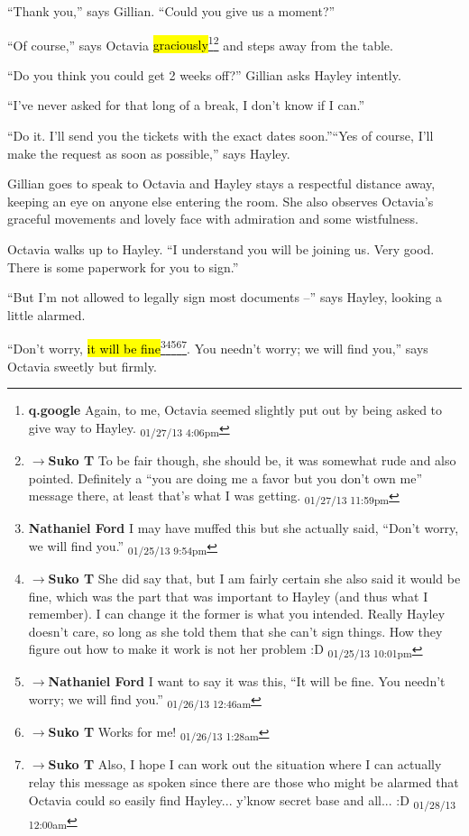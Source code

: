 ``Thank you,'' says Gillian.  ``Could you give us a moment?''

``Of course,'' says Octavia \hl{graciously}\footnote{\textbf{q.google }Again, to me, Octavia seemed slightly put out by being asked to give way to Hayley. \textsubscript{01/27/13 4:06pm}}\footnote{$\rightarrow$\textbf{Suko T }To be fair though, she should be, it was somewhat rude and also pointed.  Definitely a ``you are doing me a favor but you don't own me'' message there, at least that's what I was getting. \textsubscript{01/27/13 11:59pm}} and steps away from the table.



``Do you think you could get 2 weeks off?'' Gillian asks Hayley intently.

``I've never asked for that long of a break, I don't know if I can.''

``Do it.  I'll send you the tickets with the exact dates soon.''``Yes of course, I'll make the request as soon as possible,'' says Hayley.



Gillian goes to speak to Octavia and Hayley stays a respectful distance away, keeping an eye on anyone else entering the room.  She also observes Octavia's graceful movements and lovely face with admiration and some wistfulness.



Octavia walks up to Hayley. ``I understand you will be joining us.  Very good.  There is some paperwork for you to sign.''

``But I'm not allowed to legally sign most documents --'' says Hayley, looking a little alarmed.

``Don't worry, \hl{it will be fine}\footnote{\textbf{Nathaniel Ford }I may have muffed this but she actually said, ``Don't worry, we will find you.'' \textsubscript{01/25/13 9:54pm}}\footnote{$\rightarrow$\textbf{Suko T }She did say that, but I am fairly certain she also said it would be fine, which was the part that was important to Hayley (and thus what I remember).  I can change it the former is what you intended.  Really Hayley doesn't care, so long as she told them that she can't sign things.  How they figure out how to make it work is not her problem :D \textsubscript{01/25/13 10:01pm}}\footnote{$\rightarrow$\textbf{Nathaniel Ford }I want to say it was this, ``It will be fine. You needn't worry; we will find you.'' \textsubscript{01/26/13 12:46am}}\footnote{$\rightarrow$\textbf{Suko T }Works for me! \textsubscript{01/26/13 1:28am}}\footnote{$\rightarrow$\textbf{Suko T }Also, I hope I can work out the situation where I can actually relay this message as spoken since there are those who might be alarmed that Octavia could so easily find Hayley... y'know secret base and all... :D \textsubscript{01/28/13 12:00am}}. You needn't worry; we will find you,'' says Octavia sweetly but firmly.

